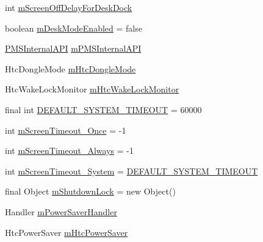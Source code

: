 \begin{DoxyCompactItemize}
\item 
int \hyperlink{classcom_1_1android_1_1server_1_1power_1_1PowerManagerService_ab9d50213c1081deb0663a7297eda7c55}{m\-Screen\-Off\-Delay\-For\-Desk\-Dock}
\item 
boolean \hyperlink{classcom_1_1android_1_1server_1_1power_1_1PowerManagerService_a6b181f4d4a51893371b0a351a30a20d1}{m\-Desk\-Mode\-Enabled} = false
\item 
\hyperlink{classcom_1_1android_1_1server_1_1power_1_1PowerManagerService_1_1PMSInternalAPI}{P\-M\-S\-Internal\-A\-P\-I} \hyperlink{classcom_1_1android_1_1server_1_1power_1_1PowerManagerService_ad51a0f516c7c73735a1f09ff7285b0ab}{m\-P\-M\-S\-Internal\-A\-P\-I}
\item 
Htc\-Dongle\-Mode \hyperlink{classcom_1_1android_1_1server_1_1power_1_1PowerManagerService_a2eedffb1e75239b86c8c1473463b1ff3}{m\-Htc\-Dongle\-Mode}
\item 
Htc\-Wake\-Lock\-Monitor \hyperlink{classcom_1_1android_1_1server_1_1power_1_1PowerManagerService_a9f70984c25681471bf0c8867faf976ed}{m\-Htc\-Wake\-Lock\-Monitor}
\item 
final int \hyperlink{classcom_1_1android_1_1server_1_1power_1_1PowerManagerService_a1e56d5b94bad2cde15b185cfaada69be}{D\-E\-F\-A\-U\-L\-T\-\_\-\-S\-Y\-S\-T\-E\-M\-\_\-\-T\-I\-M\-E\-O\-U\-T} = 60000
\item 
int \hyperlink{classcom_1_1android_1_1server_1_1power_1_1PowerManagerService_a92fc89ca04c787ef4ffae0671664dd83}{m\-Screen\-Timeout\-\_\-\-Once} = -\/1
\item 
int \hyperlink{classcom_1_1android_1_1server_1_1power_1_1PowerManagerService_a2068d738bd922f1730e4299253fe1147}{m\-Screen\-Timeout\-\_\-\-Always} = -\/1
\item 
int \hyperlink{classcom_1_1android_1_1server_1_1power_1_1PowerManagerService_a1bbb8e52b64211fbdb434f9eda3a094b}{m\-Screen\-Timeout\-\_\-\-System} = \hyperlink{classcom_1_1android_1_1server_1_1power_1_1PowerManagerService_a1e56d5b94bad2cde15b185cfaada69be}{D\-E\-F\-A\-U\-L\-T\-\_\-\-S\-Y\-S\-T\-E\-M\-\_\-\-T\-I\-M\-E\-O\-U\-T}
\item 
final Object \hyperlink{classcom_1_1android_1_1server_1_1power_1_1PowerManagerService_af2f61f27e92b46b0d255ef034098b3ce}{m\-Shutdown\-Lock} = new Object()
\item 
Handler \hyperlink{classcom_1_1android_1_1server_1_1power_1_1PowerManagerService_a51b4f66652f01219b1516010f069c6f3}{m\-Power\-Saver\-Handler}
\item 
Htc\-Power\-Saver \hyperlink{classcom_1_1android_1_1server_1_1power_1_1PowerManagerService_ae9a4593035165d0e8246614ad090f3ce}{m\-Htc\-Power\-Saver}

\end{DoxyCompactItemize}
